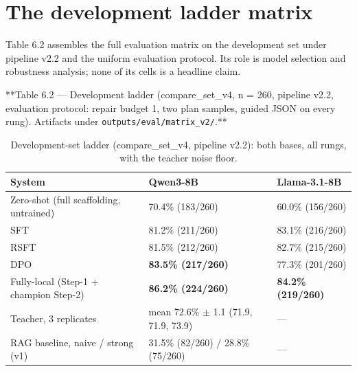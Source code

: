 \section{The development ladder matrix}\label{sec:the-development-ladder-matrix}

Table 6.2 assembles the full evaluation matrix on the development set under pipeline v2.2 and
the uniform evaluation protocol. Its role is model selection and robustness analysis; none of
its cells is a headline claim.

**Table 6.2 --- Development ladder (compare\_set\_v4, n = 260, pipeline v2.2, evaluation protocol:
repair budget 1, two plan samples, guided JSON on every rung). Artifacts under
\texttt{outputs/eval/matrix\_v2/}.**

\begin{table}[t]
\centering
\small
\caption{Development-set ladder (compare\_set\_v4, pipeline v2.2): both bases, all rungs, with the teacher noise floor.}
\label{tab:06_experiments_2}
\begin{tabular}{lll}
\toprule
System & Qwen3-8B & Llama-3.1-8B \\
\midrule
Zero-shot (full scaffolding, untrained) & 70.4\% (183/260) & 60.0\% (156/260) \\
SFT & 81.2\% (211/260) & 83.1\% (216/260) \\
RSFT & 81.5\% (212/260) & 82.7\% (215/260) \\
DPO & \textbf{83.5\% (217/260)} & 77.3\% (201/260) \\
Fully-local (Step-1 + champion Step-2) & \textbf{86.2\% (224/260)} & \textbf{84.2\% (219/260)} \\
Teacher, 3 replicates & mean 72.6\% $\pm$ 1.1 (71.9, 71.9, 73.9) & --- \\
RAG baseline, naive / strong (v1) & 31.5\% (82/260) / 28.8\% (75/260) & --- \\
\bottomrule
\end{tabular}
\end{table}


